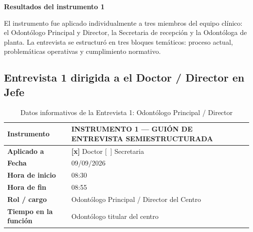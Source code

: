 
\textbf{Resultados del instrumento 1}

El instrumento fue aplicado individualmente a tres miembros del equipo clínico: el Odontólogo Principal y Director, la Secretaria de recepción y la Odontóloga de planta. La entrevista se estructuró en tres bloques temáticos: proceso actual, problemáticas operativas y cumplimiento normativo.

\subsection*{Entrevista 1 dirigida a el Doctor / Director en Jefe}

\begin{table}[H]
\centering
\caption{Datos informativos de la Entrevista 1: Odontólogo Principal / Director}
\label{tab:ent1_datos}
\fontsize{10}{12}\selectfont
\renewcommand{\arraystretch}{1.2}
\begin{tabularx}{\linewidth}{|>{\bfseries}p{3.8cm}|X|}
\hline
Instrumento & INSTRUMENTO 1 — GUIÓN DE ENTREVISTA SEMIESTRUCTURADA \\ \hline
Aplicado a  & \textbf{[x]} Doctor \quad \mbox{[~]} Secretaria \\ \hline
Fecha       & 09/09/2026 \\ \hline
Hora de inicio & 08:30 \\ \hline
Hora de fin    & 08:55 \\ \hline
Rol / cargo & Odontólogo Principal / Director del Centro \\ \hline
Tiempo en la función & Odontólogo titular del centro \\ \hline
\end{tabularx}
\end{table}

